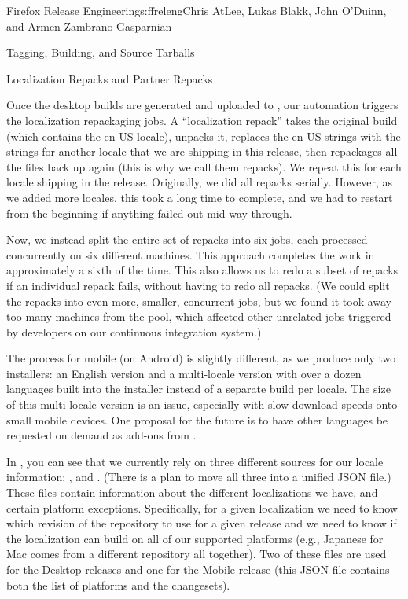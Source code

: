 \begin{aosachapter}{Firefox Release Engineering}{s:ffreleng}{Chris AtLee, Lukas Blakk, John O'Duinn, and Armen Zambrano Gasparnian}
\begin{aosasect1}{Tagging, Building, and Source Tarballs}
\end{aosasect1}

\begin{aosasect1}{Localization Repacks and Partner Repacks}


Once the desktop builds are generated and uploaded to
, our automation triggers the localization
repackaging jobs. A ``localization repack'' takes the original 
build (which contains the en-US locale), unpacks it, replaces
the en-US strings with the strings for another locale that we
are shipping in this release, then repackages all the files back
up again (this is why we call them repacks). We repeat this 
for each locale shipping in the release. Originally, we did all 
repacks serially. However, as we added more locales, this took 
a long time to complete, and we had to restart from the beginning 
if anything failed out mid-way through. 

Now, we instead split the entire set of repacks into
six jobs, each processed concurrently on six
different machines. This approach completes the work in
approximately a sixth of the time. This also allows us to redo
a subset of repacks if an individual repack fails, without
having to redo all repacks. (We could split the repacks into
even more, smaller, concurrent jobs, but we found it took away
too many machines from the pool, which affected other unrelated
jobs triggered by developers on our continuous integration
system.) 
    
The process for mobile (on Android) is slightly different, as we produce
only two installers:  an English version and a multi-locale version 
with over a dozen languages built into the installer
instead of a separate build per locale. The size of this
multi-locale version is an issue, especially with slow
download speeds onto small mobile devices. One proposal for
the future is to have other languages be requested on demand
as add-ons from .

In , you can see that we currently rely
on three different sources for our locale information:
,  and
. (There is a plan to move
all three into a unified JSON file.) These files contain information
about the different localizations we have, and certain platform
exceptions. Specifically, for a given localization we need to know
which revision of the repository to use for a given release and we
need to know if the localization can build on all of our supported
platforms (e.g.,  Japanese for Mac comes from a different repository all
together).  Two of these files are used for the Desktop releases and
one for the Mobile release (this JSON file contains both the list of
platforms and the changesets).


\end{aosasect1}
\end{aosachapter}
